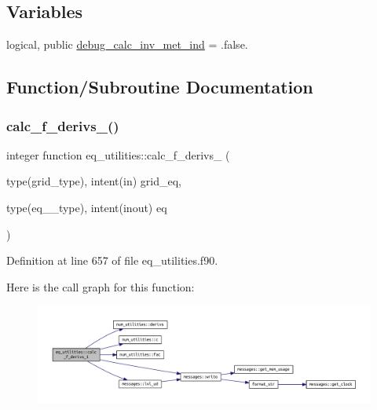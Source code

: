 \subsection*{Variables}
\begin{DoxyCompactItemize}
\item 
logical, public \hyperlink{namespaceeq__utilities_aedf0e1858d0bd16218a290f4857d416a}{debug\+\_\+calc\+\_\+inv\+\_\+met\+\_\+ind} = .false.
\end{DoxyCompactItemize}


\subsection{Function/\+Subroutine Documentation}
\mbox{\label{namespaceeq__utilities_aad960e0306e883b83c7a2c6146b48b48}} 
\subsubsection{\texorpdfstring{calc\+\_\+f\+\_\+derivs\+\_()}{calc\_f\_derivs\_1()}}
{\footnotesize\ttfamily integer function eq\+\_\+utilities\+::calc\+\_\+f\+\_\+derivs\+\_ (\begin{DoxyParamCaption}\item[{type(grid\+\_\+type), intent(in)}]{grid\+\_\+eq,  }\item[{type(eq\+\_\+1\+\_\+type), intent(inout)}]{eq }\end{DoxyParamCaption})}



Definition at line 657 of file eq\+\_\+utilities.\+f90.

Here is the call graph for this function\+:
\nopagebreak
\begin{figure}[H]
\begin{center}
\leavevmode
\includegraphics[width=350pt]{namespaceeq__utilities_aad960e0306e883b83c7a2c6146b48b48_cgraph}
\end{center}
\end{figure}
\mbox{\label{namespaceeq__utilities_a9e8269c4f0a20b8b9622fbe8739ba1a8}} 
